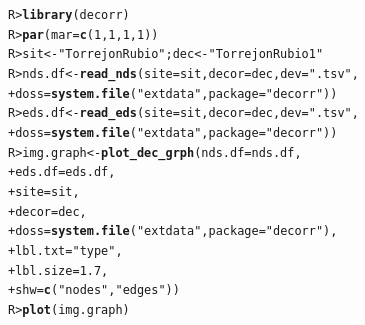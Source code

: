 \documentclass[article]{jss}\usepackage[]{graphicx}\usepackage[]{color}
\makeatletter
\newcommand{\hlnum}[1]{\textcolor[rgb]{0.686,0.059,0.569}{#1}}%
\newcommand{\hlstr}[1]{\textcolor[rgb]{0.192,0.494,0.8}{#1}}%
\newcommand{\hlstd}[1]{\textcolor[rgb]{0.345,0.345,0.345}{#1}}%
\newcommand{\hlkwb}[1]{\textcolor[rgb]{0.69,0.353,0.396}{#1}}%
\newcommand{\hlkwc}[1]{\textcolor[rgb]{0.333,0.667,0.333}{#1}}%
\newcommand{\hlkwd}[1]{\textcolor[rgb]{0.737,0.353,0.396}{\textbf{#1}}}%
\newenvironment{kframe}{%
 \def\at@end@of@kframe{}%
 \ifinner\ifhmode%
  \def\at@end@of@kframe{\end{minipage}}%
  \begin{minipage}{\columnwidth}%
 \fi\fi%
 \def\FrameCommand##1{\hskip\@totalleftmargin \hskip-\fboxsep
 \colorbox{shadecolor}{##1}\hskip-\fboxsep
     \hskip-\linewidth \hskip-\@totalleftmargin \hskip\columnwidth}%
 \MakeFramed {\advance\hsize-\width
   \@totalleftmargin\z@ \linewidth\hsize
   \@setminipage}}%
 {\par\unskip\endMakeFramed%
 \at@end@of@kframe}
\newenvironment{knitrout}{}{} %
\makeatother
\begin{document}
\begin{knitrout}
\color{fgcolor}\begin{kframe}
\begin{alltt}
\hlstd{R> }\hlkwd{library}\hlstd{(decorr)}
\hlstd{R> }\hlkwd{par}\hlstd{(}\hlkwc{mar}\hlstd{=}\hlkwd{c}\hlstd{(}\hlnum{1}\hlstd{,}\hlnum{1}\hlstd{,}\hlnum{1}\hlstd{,}\hlnum{1}\hlstd{) )}
\hlstd{R> }\hlstd{sit} \hlkwb{<-} \hlstr{"Torrejon Rubio"} \hlstd{; dec} \hlkwb{<-} \hlstr{"Torrejon Rubio 1"}
\hlstd{R> }\hlstd{nds.df} \hlkwb{<-} \hlkwd{read_nds}\hlstd{(}\hlkwc{site} \hlstd{= sit,} \hlkwc{decor} \hlstd{= dec,} \hlkwc{dev} \hlstd{=} \hlstr{".tsv"}\hlstd{,}
\hlstd{+ }                   \hlkwc{doss} \hlstd{=} \hlkwd{system.file}\hlstd{(}\hlstr{"extdata"}\hlstd{,} \hlkwc{package} \hlstd{=} \hlstr{"decorr"}\hlstd{))}
\hlstd{R> }\hlstd{eds.df} \hlkwb{<-} \hlkwd{read_eds}\hlstd{(}\hlkwc{site} \hlstd{= sit,} \hlkwc{decor} \hlstd{= dec,} \hlkwc{dev} \hlstd{=} \hlstr{".tsv"}\hlstd{,}
\hlstd{+ }                   \hlkwc{doss} \hlstd{=} \hlkwd{system.file}\hlstd{(}\hlstr{"extdata"}\hlstd{,} \hlkwc{package} \hlstd{=} \hlstr{"decorr"}\hlstd{))}
\hlstd{R> }\hlstd{img.graph} \hlkwb{<-} \hlkwd{plot_dec_grph}\hlstd{(}\hlkwc{nds.df} \hlstd{= nds.df,}
\hlstd{+ }                           \hlkwc{eds.df} \hlstd{= eds.df,}
\hlstd{+ }                           \hlkwc{site} \hlstd{= sit,}
\hlstd{+ }                           \hlkwc{decor} \hlstd{= dec,}
\hlstd{+ }                           \hlkwc{doss} \hlstd{=} \hlkwd{system.file}\hlstd{(}\hlstr{"extdata"}\hlstd{,} \hlkwc{package} \hlstd{=} \hlstr{"decorr"}\hlstd{),}
\hlstd{+ }                           \hlkwc{lbl.txt} \hlstd{=} \hlstr{"type"}\hlstd{,}
\hlstd{+ }                           \hlkwc{lbl.size}\hlstd{=}\hlnum{1.7}\hlstd{,}
\hlstd{+ }                           \hlkwc{shw} \hlstd{=} \hlkwd{c}\hlstd{(}\hlstr{"nodes"}\hlstd{,}\hlstr{"edges"}\hlstd{))}
\hlstd{R> }\hlkwd{plot}\hlstd{(img.graph)}
\end{alltt}
\end{kframe}\begin{figure}[H]


\end{figure}
\end{knitrout}
\end{document}
